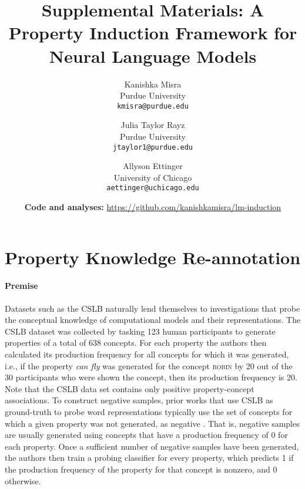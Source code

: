 \documentclass[11pt]{article}    %
\title{\bf Supplemental Materials: A Property Induction Framework for Neural Language Models}
\author{
Kanishka Misra\\
Purdue University\\
\texttt{\small kmisra@purdue.edu}
\and 
Julia Taylor Rayz\\
Purdue University\\
\texttt{\small jtaylor1@purdue.edu}
\and 
Allyson Ettinger\\
University of Chicago\\
\texttt{\small aettinger@uchicago.edu}
}
\date{\textbf{Code and analyses:} \url{https://github.com/kanishkamisra/lm-induction}}
\begin{document}
\maketitle

\section{Property Knowledge Re-annotation}
\paragraph{Premise}
Datasets such as the CSLB \citep{devereux2014centre} naturally lend themselves to investigations that probe the conceptual knowledge of computational models and their representations.
The CSLB dataset was collected by tasking 123 human participants to generate properties of a total of 638 concepts. For each property the authors then calculated its production frequency for all concepts for which it was generated, i.e., if the property \textit{can fly} was generated for the concept \textsc{robin} by 20 out of the 30 participants who were shown the concept, then its production frequency is 20. Note that the CSLB data set contains only positive property-concept associations. To construct negative samples, prior works that use CSLB as ground-truth to probe word representations typically use the set of concepts for which a given property was not generated, as negative \citep[e.g.][]{lucy-gauthier-2017-distributional, forbes2019neural, da-kasai-2019-cracking, bhatia2020transformer}. That is, negative samples are usually generated using concepts that have a production frequency of 0 for each property. Once a sufficient number of negative samples have been generated, the authors then train a probing classifier for every property, which predicts 1 if the production frequency of the property for that concept is nonzero, and 0 otherwise.
\end{document}
